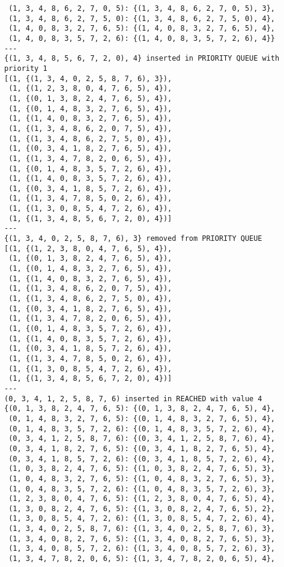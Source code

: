 \documentclass{article}
\begin{document}
\begin{verbatim}
 (1, 3, 4, 8, 6, 2, 7, 0, 5): {(1, 3, 4, 8, 6, 2, 7, 0, 5), 3},
 (1, 3, 4, 8, 6, 2, 7, 5, 0): {(1, 3, 4, 8, 6, 2, 7, 5, 0), 4},
 (1, 4, 0, 8, 3, 2, 7, 6, 5): {(1, 4, 0, 8, 3, 2, 7, 6, 5), 4},
 (1, 4, 0, 8, 3, 5, 7, 2, 6): {(1, 4, 0, 8, 3, 5, 7, 2, 6), 4}}
---
{(1, 3, 4, 8, 5, 6, 7, 2, 0), 4} inserted in PRIORITY QUEUE with priority 1
[(1, {(1, 3, 4, 0, 2, 5, 8, 7, 6), 3}),
 (1, {(1, 2, 3, 8, 0, 4, 7, 6, 5), 4}),
 (1, {(0, 1, 3, 8, 2, 4, 7, 6, 5), 4}),
 (1, {(0, 1, 4, 8, 3, 2, 7, 6, 5), 4}),
 (1, {(1, 4, 0, 8, 3, 2, 7, 6, 5), 4}),
 (1, {(1, 3, 4, 8, 6, 2, 0, 7, 5), 4}),
 (1, {(1, 3, 4, 8, 6, 2, 7, 5, 0), 4}),
 (1, {(0, 3, 4, 1, 8, 2, 7, 6, 5), 4}),
 (1, {(1, 3, 4, 7, 8, 2, 0, 6, 5), 4}),
 (1, {(0, 1, 4, 8, 3, 5, 7, 2, 6), 4}),
 (1, {(1, 4, 0, 8, 3, 5, 7, 2, 6), 4}),
 (1, {(0, 3, 4, 1, 8, 5, 7, 2, 6), 4}),
 (1, {(1, 3, 4, 7, 8, 5, 0, 2, 6), 4}),
 (1, {(1, 3, 0, 8, 5, 4, 7, 2, 6), 4}),
 (1, {(1, 3, 4, 8, 5, 6, 7, 2, 0), 4})]
---
{(1, 3, 4, 0, 2, 5, 8, 7, 6), 3} removed from PRIORITY QUEUE
[(1, {(1, 2, 3, 8, 0, 4, 7, 6, 5), 4}),
 (1, {(0, 1, 3, 8, 2, 4, 7, 6, 5), 4}),
 (1, {(0, 1, 4, 8, 3, 2, 7, 6, 5), 4}),
 (1, {(1, 4, 0, 8, 3, 2, 7, 6, 5), 4}),
 (1, {(1, 3, 4, 8, 6, 2, 0, 7, 5), 4}),
 (1, {(1, 3, 4, 8, 6, 2, 7, 5, 0), 4}),
 (1, {(0, 3, 4, 1, 8, 2, 7, 6, 5), 4}),
 (1, {(1, 3, 4, 7, 8, 2, 0, 6, 5), 4}),
 (1, {(0, 1, 4, 8, 3, 5, 7, 2, 6), 4}),
 (1, {(1, 4, 0, 8, 3, 5, 7, 2, 6), 4}),
 (1, {(0, 3, 4, 1, 8, 5, 7, 2, 6), 4}),
 (1, {(1, 3, 4, 7, 8, 5, 0, 2, 6), 4}),
 (1, {(1, 3, 0, 8, 5, 4, 7, 2, 6), 4}),
 (1, {(1, 3, 4, 8, 5, 6, 7, 2, 0), 4})]
---
(0, 3, 4, 1, 2, 5, 8, 7, 6) inserted in REACHED with value 4
{(0, 1, 3, 8, 2, 4, 7, 6, 5): {(0, 1, 3, 8, 2, 4, 7, 6, 5), 4},
 (0, 1, 4, 8, 3, 2, 7, 6, 5): {(0, 1, 4, 8, 3, 2, 7, 6, 5), 4},
 (0, 1, 4, 8, 3, 5, 7, 2, 6): {(0, 1, 4, 8, 3, 5, 7, 2, 6), 4},
 (0, 3, 4, 1, 2, 5, 8, 7, 6): {(0, 3, 4, 1, 2, 5, 8, 7, 6), 4},
 (0, 3, 4, 1, 8, 2, 7, 6, 5): {(0, 3, 4, 1, 8, 2, 7, 6, 5), 4},
 (0, 3, 4, 1, 8, 5, 7, 2, 6): {(0, 3, 4, 1, 8, 5, 7, 2, 6), 4},
 (1, 0, 3, 8, 2, 4, 7, 6, 5): {(1, 0, 3, 8, 2, 4, 7, 6, 5), 3},
 (1, 0, 4, 8, 3, 2, 7, 6, 5): {(1, 0, 4, 8, 3, 2, 7, 6, 5), 3},
 (1, 0, 4, 8, 3, 5, 7, 2, 6): {(1, 0, 4, 8, 3, 5, 7, 2, 6), 3},
 (1, 2, 3, 8, 0, 4, 7, 6, 5): {(1, 2, 3, 8, 0, 4, 7, 6, 5), 4},
 (1, 3, 0, 8, 2, 4, 7, 6, 5): {(1, 3, 0, 8, 2, 4, 7, 6, 5), 2},
 (1, 3, 0, 8, 5, 4, 7, 2, 6): {(1, 3, 0, 8, 5, 4, 7, 2, 6), 4},
 (1, 3, 4, 0, 2, 5, 8, 7, 6): {(1, 3, 4, 0, 2, 5, 8, 7, 6), 3},
 (1, 3, 4, 0, 8, 2, 7, 6, 5): {(1, 3, 4, 0, 8, 2, 7, 6, 5), 3},
 (1, 3, 4, 0, 8, 5, 7, 2, 6): {(1, 3, 4, 0, 8, 5, 7, 2, 6), 3},
 (1, 3, 4, 7, 8, 2, 0, 6, 5): {(1, 3, 4, 7, 8, 2, 0, 6, 5), 4},

\end{verbatim}
\end{document}
